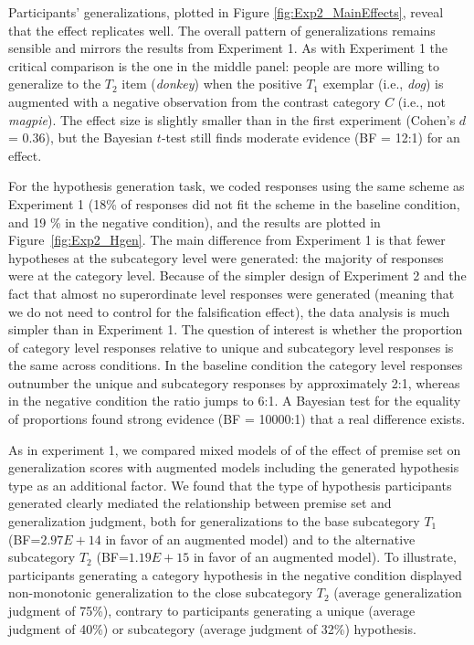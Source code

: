 \documentclass[authoryear,11pt]{elsarticle}
\begin{document}
Participants' generalizations, plotted in Figure \ref{fig:Exp2_MainEffects}, reveal that the effect replicates well. The overall pattern of generalizations remains sensible and mirrors the results from Experiment 1. As with Experiment 1 the critical comparison is the one in the middle panel: people are more willing to generalize to the $T_2$ item ({\it donkey}) when the positive $T_1$ exemplar (i.e., {\it dog}) is augmented with a negative observation from the contrast category $C$ (i.e., not {\it magpie}). The effect size is slightly smaller than in the first experiment (Cohen's $d$ = 0.36), but the Bayesian $t$-test still finds moderate evidence (BF = 12:1) for an effect.

For the hypothesis generation task, we coded responses using the same scheme as Experiment 1 (18\% of responses did not fit the scheme in the {\sc baseline} condition, and 19 \% in the {\sc negative} condition), and the results are plotted in Figure~\ref{fig:Exp2_Hgen}. The main difference from Experiment 1 is that fewer hypotheses at the {\sc subcategory} level were generated: the majority of responses were at the {\sc category} level. Because of the simpler design of Experiment 2 and the fact that almost no {\sc superordinate} level responses were generated (meaning that we do not need to control for the falsification effect), the data analysis is much simpler than in Experiment 1. The question of interest is whether the proportion of {\sc category} level responses relative to {\sc unique} and {\sc subcategory} level responses is the same across conditions. In the {\sc baseline} condition the {\sc category} level responses outnumber the {\sc unique} and {\sc subcategory} responses by approximately 2:1, whereas in the {\sc negative} condition the ratio jumps to 6:1. A Bayesian test for the equality of proportions found strong evidence (BF = 10000:1) that a real difference exists.

As in experiment 1, we compared mixed models of of the effect of premise set on generalization scores with augmented models including the generated hypothesis type as an additional factor. We found that the type of hypothesis participants generated clearly mediated the relationship between premise set and generalization judgment, both for generalizations to the base subcategory $T_1$ (BF=$2.97E+14$ in favor of an augmented model) and to the alternative subcategory $T_2$ (BF=$1.19E+15$ in favor of an augmented model). To illustrate, participants generating a {\sc category} hypothesis in the {\sc negative} condition displayed non-monotonic generalization to the close subcategory $T_2$ (average generalization judgment of 75\%), contrary to participants generating a {\sc unique} (average judgment of 40\%) or {\sc subcategory} (average judgment of 32\%) hypothesis.
\end{document}
